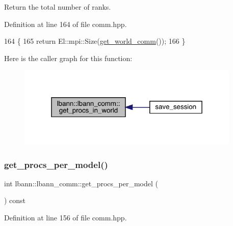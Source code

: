 Return the total number of ranks. 

Definition at line 164 of file comm.\+hpp.


\begin{DoxyCode}
164                                         \{
165     \textcolor{keywordflow}{return} El::mpi::Size(\hyperlink{classlbann_1_1lbann__comm_a0493f1f0c42b95674daacf5288fdb073}{get\_world\_comm}());
166   \}
\end{DoxyCode}
Here is the caller graph for this function\+:\nopagebreak
\begin{figure}[H]
\begin{center}
\leavevmode
\includegraphics[width=301pt]{classlbann_1_1lbann__comm_a1eb92927a8f8bcbdd677ccecc1a33c59_icgraph}
\end{center}
\end{figure}
\mbox{\label{classlbann_1_1lbann__comm_a5755dfdfc6377b4cae5ef8f7819e17de}} 
\subsubsection{\texorpdfstring{get\+\_\+procs\+\_\+per\+\_\+model()}{get\_procs\_per\_model()}}
{\footnotesize\ttfamily int lbann\+::lbann\+\_\+comm\+::get\+\_\+procs\+\_\+per\+\_\+model (\begin{DoxyParamCaption}{ }\end{DoxyParamCaption}) const\hspace{0.3cm}{\ttfamily [inline]}}



Definition at line 156 of file comm.\+hpp.


